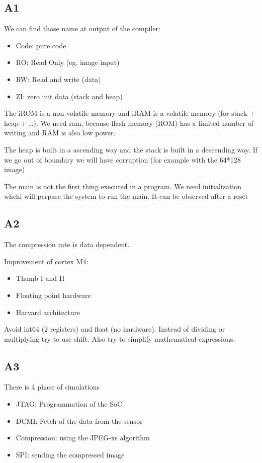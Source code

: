 \subsection{A1}

We can find those name at output of the compiler:
\begin{itemize}
  \item Code: pure code
  \item RO: Read Only (eg. image input)
  \item RW: Read and write (data)
  \item ZI: zero init data (stack and heap)
\end{itemize}
\bigbreak
The iROM is a non volatile memory and iRAM is a volatile memory (for stack + heap + \dots). We need ram, because flash memory (ROM) has a limited number of writing and RAM is also low power.

The heap is built in a ascending way and the stack is built in a descending way. If we go out of boundary we will have corruption (for example with the 64*128 image)

\bigbreak
The main is not the first thing executed in a program. We need initialization whchi will perpare the system to run the main. It can be observed after a reset


\subsection{A2}

The compression rate is data dependent. 

Improvement of cortex M4:
\begin{itemize}
  \item Thumb I and II
  \item Floating point hardware
  \item Harvard architecture
\end{itemize}

Avoid int64 (2 registers) and float (no hardware). Instead of dividing or multiplying try to use shift. Also try to simplify mathematical expressions.


\subsection{A3}
There is 4 phase of simulations
\begin{itemize}
  \item JTAG: Programmation of the SoC
  \item DCMI: Fetch of the data from the sensor
  \item Compression: using the JPEG-xs algorithm
  \item SPI: sending the compressed image
\end{itemize}

